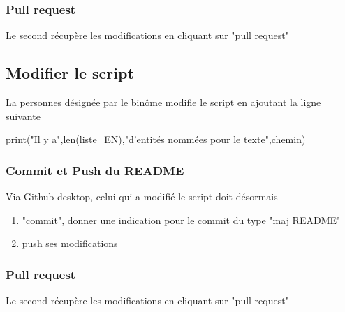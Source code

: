 \subsubsection{Pull request}
Le second récupère les modifications en cliquant sur "pull request"

\subsection{Modifier le script}

La personnes désignée par le binôme modifie le script en ajoutant la ligne suivante 

\begin{python}
 print("Il y a",len(liste_EN),"d'entités nommées pour le texte",chemin)
\end{python}
\subsubsection{Commit et Push du README}
Via Github desktop, celui qui a modifié le script doit désormais 
\begin{enumerate}
\item "commit", donner une indication pour le commit du type "maj README"
\item push ses modifications
\end{enumerate}

\subsubsection{Pull request}
Le second récupère les modifications en cliquant sur "pull request"


\begin{center}

\noindent{}
	\end{center}
